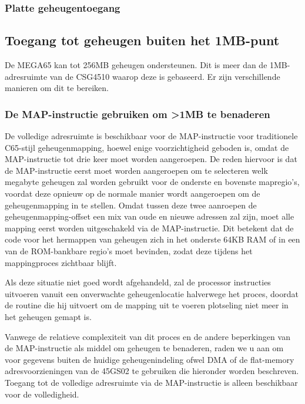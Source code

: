 \subsubsection{Platte geheugentoegang}

\subsection{Toegang tot geheugen buiten het 1MB-punt}
\label{sec:extended-memory}

De MEGA65 kan tot 256MB geheugen ondersteunen. Dit is meer dan de 1MB-adresruimte van de CSG4510 waarop deze is gebaseerd. Er zijn verschillende manieren om dit te bereiken.

\subsubsection{De MAP-instructie gebruiken om >1MB te benaderen}

De volledige adresruimte is beschikbaar voor de MAP-instructie voor traditionele C65-stijl geheugenmapping, hoewel enige voorzichtigheid geboden is, omdat de MAP-instructie tot drie keer moet worden aangeroepen. De reden hiervoor is dat de MAP-instructie eerst moet worden aangeroepen om te selecteren welk megabyte geheugen zal worden gebruikt voor de onderste en bovenste mapregio's, voordat deze opnieuw op de normale manier wordt aangeroepen om de geheugenmapping in te stellen. Omdat tussen deze twee aanroepen de geheugenmapping-offset een mix van oude en nieuwe adressen zal zijn, moet alle mapping eerst worden uitgeschakeld via de MAP-instructie. Dit betekent dat de code voor het hermappen van geheugen zich in het onderste 64KB RAM of in een van de ROM-bankbare regio's moet bevinden, zodat deze tijdens het mappingproces zichtbaar blijft.

Als deze situatie niet goed wordt afgehandeld, zal de processor instructies uitvoeren vanuit een onverwachte geheugenlocatie halverwege het proces, doordat de routine die hij uitvoert om de mapping uit te voeren plotseling niet meer in het geheugen gemapt is.

Vanwege de relatieve complexiteit van dit proces en de andere beperkingen van de MAP-instructie als middel om geheugen te benaderen, raden we u aan om voor gegevens buiten de huidige geheugenindeling ofwel DMA of de flat-memory adresvoorzieningen van de 45GS02 te gebruiken die hieronder worden beschreven. Toegang tot de volledige adresruimte via de MAP-instructie is alleen beschikbaar voor de volledigheid.

